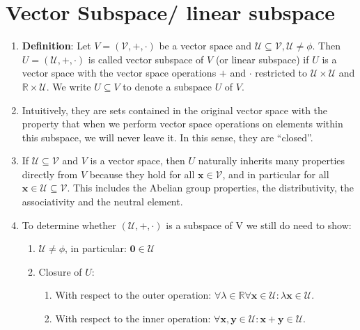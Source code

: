 \section{Vector Subspace/ linear subspace}


\begin{enumerate}
    \item \textbf{Definition}: Let $V = (\mathcal{V}, +, \cdot )$ be a vector space and $\mathcal{U} \subseteq \mathcal{V}, \mathcal{U} \neq \phi$. 
    Then $U = (\mathcal{U}, +, \cdot )$ is called vector subspace of $V$ (or linear subspace) if $U$ is a vector space with the vector space operations $+$ and $\cdot$  restricted to $\mathcal{U} \times \mathcal{U}$ and $\mathbb{R} \times \mathcal{U}$. 
    We write $U \subseteq V$ to denote a subspace $U$ of $V$.
    \hfill \cite{mfml/book/mml/Deisenroth-Faisal-Ong}

    \item Intuitively, they are sets contained in the original vector space with the property that when we perform vector space operations on elements within this subspace, we will never leave it. 
    In this sense, they are “closed”.
    \hfill \cite{mfml/book/mml/Deisenroth-Faisal-Ong}

    \item If $\mathcal{U} \subseteq \mathcal{V}$ and $V$ is a vector space, then $U$ naturally inherits many properties directly from $V$ because they hold for all $\bm{x} \in \mathcal{V}$, and in particular for all $\bm{x} \in \mathcal{U} \subseteq \mathcal{V}$. 
    This includes the Abelian group properties, the distributivity, the associativity and the neutral element.
    \hfill \cite{mfml/book/mml/Deisenroth-Faisal-Ong}

    \item To determine whether $(\mathcal{U}, +, \cdot)$ is a subspace of V we still do need to show:
    \begin{enumerate}
        \item $\mathcal{U} \neq \phi$, in particular: $\bm{0} \in \mathcal{U}$
        \hfill \cite{mfml/book/mml/Deisenroth-Faisal-Ong}

        \item Closure of $U$:
        \begin{enumerate}
            \item With respect to the outer operation: $\forall \lambda  \in  \mathbb{R} \forall \bm{x} \in  \mathcal{U} : \lambda \bm{x} \in  \mathcal{U}$.
            \hfill \cite{mfml/book/mml/Deisenroth-Faisal-Ong}
            
            \item With respect to the inner operation: $\forall \bm{x}, \bm{y} \in  \mathcal{U} : \bm{x} + \bm{y} \in  \mathcal{U}$.
            \hfill \cite{mfml/book/mml/Deisenroth-Faisal-Ong}
        \end{enumerate}
    \end{enumerate}

\end{enumerate}


